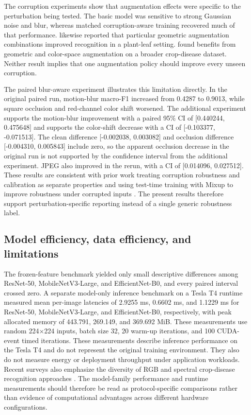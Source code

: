 \documentclass{sbc2023}%
\begin{document}
The corruption experiments show that augmentation effects were specific to the perturbation being tested. The basic model was sensitive to strong Gaussian noise and blur, whereas matched corruption-aware training recovered much of that performance. \citet{r06} likewise reported that particular geometric augmentation combinations improved recognition in a plant-leaf setting. \citet{r27} found benefits from geometric and color-space augmentation on a broader crop-disease dataset. Neither result implies that one augmentation policy should improve every unseen corruption.

The paired blur-aware experiment illustrates this limitation directly. In the original paired run, motion-blur macro-F1 increased from 0.4287 to 0.9013, while square occlusion and red-channel color shift worsened. The additional experiment supports the motion-blur improvement with a paired 95\% CI of [0.440244, 0.475648] and supports the color-shift decrease with a CI of [-0.103377, -0.071513]. The clean difference [-0.002038, 0.003082] and occlusion difference [-0.004310, 0.005843] include zero, so the apparent occlusion decrease in the original run is not supported by the confidence interval from the additional experiment. JPEG also improved in the rerun, with a CI of [0.014096, 0.027512]. These results are consistent with prior work treating corruption robustness and calibration as separate properties and using test-time training with Mixup to improve robustness under corrupted inputs \cite{r07,r11}. The present results therefore support perturbation-specific reporting instead of a single generic robustness label.

\subsection{Model efficiency, data efficiency, and limitations}
The frozen-feature benchmark yielded only small descriptive differences among ResNet-50, MobileNetV3-Large, and EfficientNet-B0, and every paired interval crossed zero. A separate model-only inference benchmark on a Tesla T4 runtime measured mean per-image latencies of 2.9255 ms, 0.6602 ms, and 1.1229 ms for ResNet-50, MobileNetV3-Large, and EfficientNet-B0, respectively, with peak allocated memory of 443.791, 269.149, and 369.692 MiB. These measurements use random 224$\times$224 inputs, batch size 32, 20 warm-up iterations, and 100 CUDA-event timed iterations. These measurements describe inference performance on the Tesla T4 and do not represent the original training environment. They also do not measure energy or deployment throughput under application workloads. Recent surveys also emphasize the diversity of RGB and spectral crop-disease recognition approaches \cite{r38}. The model-family performance and runtime measurements should therefore be read as protocol-specific comparisons rather than evidence of computational advantages across different hardware configurations.
\end{document}

